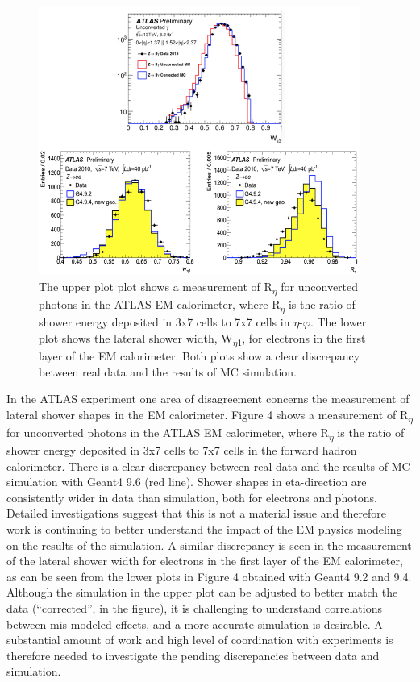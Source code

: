 \documentclass[12pt,a4paper]{article}
\begin{document}
\begin{figure}[bthp]
\centering
\includegraphics[width=0.94\textwidth]{image4.png}
\caption{The upper plot plot shows a measurement of R\textsubscript{$\eta$}
for unconverted photons in the ATLAS EM calorimeter, where
R\textsubscript{$\eta$} is the ratio of shower energy deposited in 3x7
cells to 7x7 cells in $\eta$-$\varphi$. The lower plot shows the lateral shower
width, W\textsubscript{$\eta1$}, for electrons in the first layer of the EM
calorimeter. Both plots show a clear discrepancy between real data and
the results of MC simulation.}
\label{fig:R}
\end{figure}



In the ATLAS experiment one area of disagreement concerns the
measurement of lateral shower shapes in the EM calorimeter. Figure 4
shows a measurement of R\textsubscript{$\eta$}  for unconverted photons in the
ATLAS EM calorimeter, where R\textsubscript{$\eta$} 
is the ratio of shower
energy deposited in 3x7 cells to 7x7 cells in the forward hadron
calorimeter. There is a clear discrepancy between real data and the
results of MC simulation with Geant4 9.6 (red line). Shower shapes in
eta-direction are consistently wider in data than simulation, both for
electrons and photons. Detailed investigations suggest that this is not
a material issue and therefore work is continuing to better understand
the impact of the EM physics modeling on the results of the simulation.
A similar discrepancy is seen in the measurement of the lateral shower
width for electrons in the first layer of the EM calorimeter, as can be
seen from the lower plots in Figure 4 obtained with Geant4 9.2 and 9.4.
Although the simulation in the upper plot can be adjusted to better
match the data (``corrected'', in the figure), it is challenging to
understand correlations between mis-modeled effects, and a more accurate
simulation is desirable. A substantial amount of work and high level of
coordination with experiments is therefore needed to investigate the
pending discrepancies between data and simulation.
\end{document}
